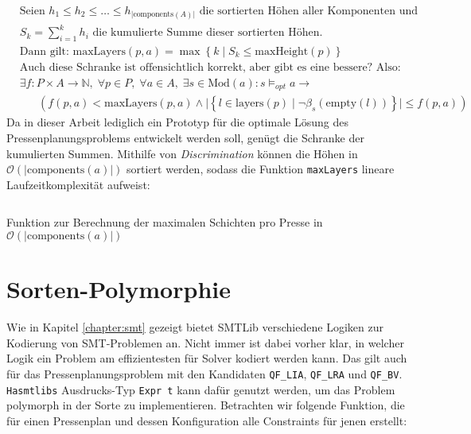 \begin{align*}
    &\hspace{0pt}\text{Seien } h_1 \leq h_2 \leq \ldots \leq h_{\lvert \text{components}(A)\rvert} \text{ die sortierten Höhen aller Komponenten und} \\
    &\hspace{0pt}S_k = \sum_{i = 1}^{k} h_i \text{ die kumulierte Summe dieser sortierten Höhen.} \\
    &\hspace{0pt}\text{Dann gilt: } \text{maxLayers}(p,a) = \max\left\{ k \mid S_k \leq \text{maxHeight}(p) \right\} \\
    &\hspace{0pt}\text{Auch diese Schranke ist offensichtlich korrekt, aber gibt es eine bessere? Also:} \\
    &\hspace{0pt}\exists f: P \times A \rightarrow \mathbb{N}, \; \forall p \in P, \; \forall a \in A, \; \exists s \in \text{Mod}(a): s \models_{opt} a \rightarrow \\
    &\hspace{20pt}\left(f(p,a) < \text{maxLayers}(p,a) \land \lvert \left\{ l \in \text{layers}(p) \mid \neg \beta_{s}(\text{empty}(l)) \right\} \rvert \leq f(p,a) \right)
\end{align*}
Da in dieser Arbeit lediglich ein Prototyp für die optimale Lösung des Pressenplanungsproblems entwickelt werden soll, genügt die Schranke der kumulierten Summen.
Mithilfe von \textit{Discrimination} \cite{discriminationPaper, discriminationHaskell} können die Höhen in $\mathcal{O}(\lvert \text{components}(a) \rvert)$ sortiert werden,
sodass die Funktion \texttt{maxLayers} lineare Laufzeitkomplexität aufweist:

\begin{listing}[H]
    \inputminted[linenos=true]{haskell}{Code/Implementierung/MaxLayers.hs}
    \caption{Funktion zur Berechnung der maximalen Schichten pro Presse in $\mathcal{O}(\lvert \text{components}(a) \rvert)$}
    \label{listing:maxlayersimpl}
\end{listing}

\section{Sorten-Polymorphie}
Wie in Kapitel \ref{chapter:smt} gezeigt bietet SMTLib verschiedene Logiken zur Kodierung von SMT-Problemen an.
Nicht immer ist dabei vorher klar, in welcher Logik ein Problem am effizientesten für Solver kodiert werden kann.
Das gilt auch für das Pressenplanungsproblem mit den Kandidaten \texttt{QF\_LIA}, \texttt{QF\_LRA} und \texttt{QF\_BV}.
\texttt{Hasmtlibs} Ausdrucks-Typ \texttt{Expr t} kann dafür genutzt werden, um das Problem polymorph in der Sorte zu implementieren.
Betrachten wir folgende Funktion, die für einen Pressenplan und dessen Konfiguration alle Constraints für jenen erstellt:

